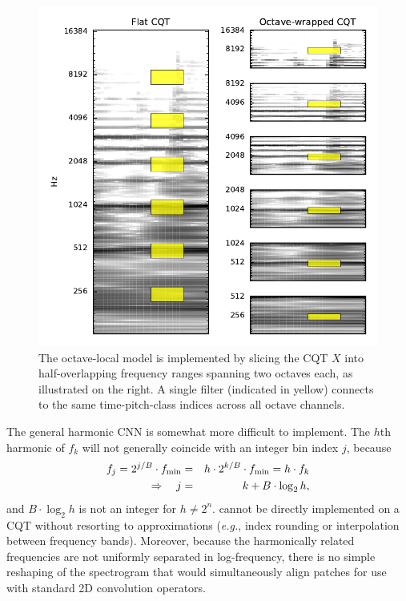 \documentclass{article}
\def\eg{\emph{e.g.}}
\begin{document}
\begin{figure}
    \includegraphics[width=\columnwidth]{figs/octave-local}
    \caption{The octave-local model is implemented by slicing the CQT $X$ into half-overlapping frequency ranges spanning two octaves each, as illustrated on the right.
    A single filter (indicated in yellow) connects to the same time-pitch-class indices across all octave channels.}
\label{fig:ocnn}
\end{figure}


The general harmonic CNN is somewhat more difficult to implement.
The $h$th harmonic of $f_k$ will not generally coincide with an integer bin index $j$, because
\begin{eqnarray}
    f_j = 2^{j/B} \cdot f_{\min} &=& h \cdot 2^{k/B}\cdot f_{\min} = h \cdot f_k \notag \\
\Rightarrow \quad j &=& k + B \cdot \log_2 h,
\end{eqnarray}
and $B \cdot\log_2 h$ is not an integer for $h \neq 2^n$.
 cannot be directly implemented on a CQT without resorting to approximations (\eg, index rounding or interpolation between frequency bands).
Moreover, because the harmonically related frequencies are not uniformly separated in log-frequency, there is no simple reshaping of the spectrogram that would simultaneously align patches for use with standard 2D convolution operators.
\end{document}

